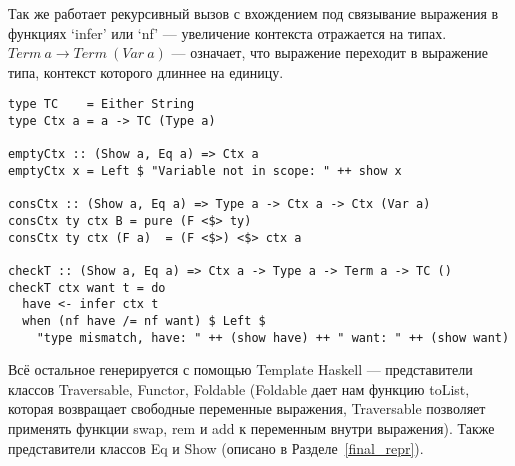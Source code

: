 Так же работает рекурсивный вызов с вхождением под связывание выражения в функциях `infer' или `nf' --- увеличение контекста отражается на типах. $Term\ a \rightarrow Term\ (Var\ a)$ --- означает, что выражение переходит в выражение типа, контекст которого длиннее на единицу.

\begin{lstlisting}[caption={Проверка типов и контексты},captionpos=b, frame=single, float,floatplacement=H, label={lst_checkT}]
type TC    = Either String
type Ctx a = a -> TC (Type a)

emptyCtx :: (Show a, Eq a) => Ctx a
emptyCtx x = Left $ "Variable not in scope: " ++ show x

consCtx :: (Show a, Eq a) => Type a -> Ctx a -> Ctx (Var a)
consCtx ty ctx B = pure (F <$> ty)
consCtx ty ctx (F a)  = (F <$>) <$> ctx a

checkT :: (Show a, Eq a) => Ctx a -> Type a -> Term a -> TC ()
checkT ctx want t = do
  have <- infer ctx t
  when (nf have /= nf want) $ Left $
    "type mismatch, have: " ++ (show have) ++ " want: " ++ (show want)
\end{lstlisting}

Всё остальное генерируется с помощью Template Haskell\cite{TH} --- представители классов Traversable\cite{deriveFun}, Functor, Foldable (Foldable дает нам функцию toList, которая возвращает свободные переменные выражения, Traversable позволяет применять функции swap, rem и add к переменным внутри выражения). Также представители классов Eq и Show (описано в Разделе~\ref{final_repr}).



